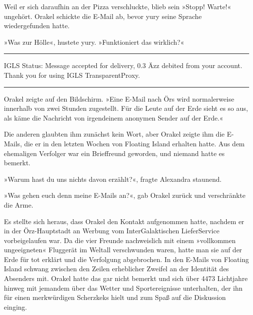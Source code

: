 Weil er sich daraufhin an der Pizza verschluckte, blieb sein »Stopp! Warte!« ungehört. Orakel schickte die E-Mail ab, bevor yury seine Sprache wiedergefunden hatte.

»Was zur Hölle«, hustete yury. »Funktioniert das wirklich?«

\noindent \parbox{\textwidth}{ \vspace{3ex} \hrule \vspace{3ex}

    \begin{footnotesize}
    \begin{ttfamily}

\noindent IGLS Status: Message accepted for delivery, 0.3 Äzz debited from your account. Thank you for using IGLS TransparentProxy.

    \end{ttfamily}
    \end{footnotesize}

\vspace{3ex} \hrule \vspace{3ex} }

Orakel zeigte auf den Bildschirm. »Eine E-Mail nach Örs wird normalerweise innerhalb von zwei Stunden zugestellt. Für die Leute auf der Erde sieht es so aus, als käme die Nachricht von irgendeinem anonymen Sender auf der Erde.«

Die anderen glaubten ihm zunächst kein Wort, aber Orakel zeigte ihm die E-Mails, die er in den letzten Wochen von Floating Island erhalten hatte. Aus dem ehemaligen Verfolger war ein Brieffreund geworden, und niemand hatte es bemerkt.

»Warum hast du uns nichts davon erzählt?«, fragte Alexandra staunend.

»Was gehen euch denn meine E-Mails an?«, gab Orakel zurück und verschränkte die Arme.

Es stellte sich heraus, dass Orakel den Kontakt aufgenommen hatte, nachdem er in der Örz-Hauptstadt an Werbung vom InterGalaktischen LieferService vorbeigelaufen war. Da die vier Freunde nachweislich mit einem »vollkommen ungeeigneten« Fluggerät im Weltall verschwunden waren, hatte man sie auf der Erde für tot erklärt und die Verfolgung abgebrochen. In den E-Mails von Floating Island schwang zwischen den Zeilen erheblicher Zweifel an der Identität des Absenders mit. Orakel hatte das gar nicht bemerkt und sich über 4473 Lichtjahre hinweg mit jemandem über das Wetter und Sportereignisse unterhalten, der ihn für einen merkwürdigen Scherzkeks hielt und zum Spaß auf die Diskussion einging.

